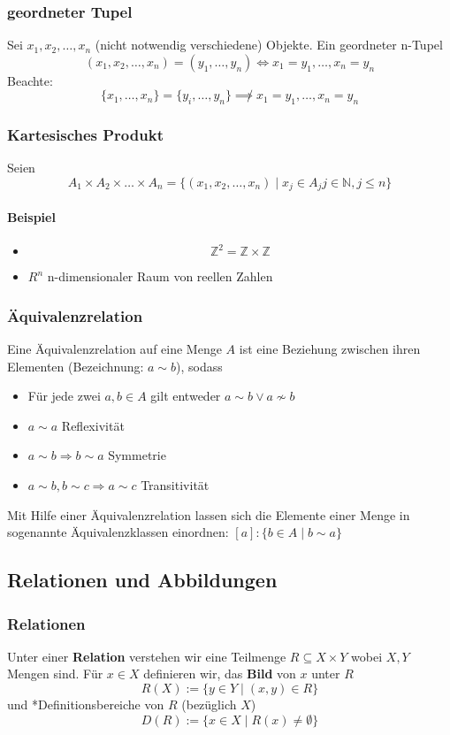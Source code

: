 \documentclass[a4paper]{scrartcl}
\begin{document}
\subsubsection{geordneter Tupel}
\label{sec-2-2-6}
Sei $x_1, x_2, \ldots, x_n$ (nicht notwendig verschiedene) Objekte. Ein geordneter n-Tupel \[(x_1,x_2,\ldots,x_n) = (y_1,\ldots,y_n) \Leftrightarrow x_1 = y_1, \ldots, x_n = y_n\]
Beachte:
\[\{x_1, \ldots, x_n\} = \{y_i,\ldots,y_n\}\not\implies x_1 = y_1, \ldots, x_n = y_n\]
\subsubsection{Kartesisches Produkt}
\label{sec-2-2-7}
Seien \[A_1\times A_2\times \ldots \times A_n = \{(x_1,x_2,\ldots,x_n)\mid x_j \in A_j j\in\mathbb{N}, j \leq n\}\]
\paragraph{Beispiel}
\label{sec-2-2-7-1}
\begin{itemize}
\item \[\mathbb{Z}^2 = \mathbb{Z}\times \mathbb{Z}\]
\item $R^n$ n-dimensionaler Raum von reellen Zahlen
\end{itemize}
\subsubsection{Äquivalenzrelation}
\label{sec-2-2-8}
Eine Äquivalenzrelation auf eine Menge $A$ ist eine Beziehung zwischen ihren Elementen (Bezeichnung: $a \sim b$), sodass
\begin{itemize}
\item Für jede zwei $a,b\in A$ gilt entweder $a\sim b \vee a\not\sim b$
\item $a\sim a$ \hfill Reflexivität
\item $a\sim b \Rightarrow b\sim a$ \hfill Symmetrie
\item $a \sim b, b \sim c \Rightarrow a \sim c$ \hfill Transitivität
\end{itemize}
Mit Hilfe einer Äquivalenzrelation lassen sich die Elemente einer Menge in sogenannte Äquivalenzklassen einordnen: $[a]:\{b\in A\mid b\sim a\}$
\subsection{Relationen und Abbildungen}
\label{sec-2-3}
\subsubsection{Relationen}
\label{sec-2-3-1}
Unter einer \textbf{Relation} verstehen wir eine Teilmenge $R\subseteq X\times Y$ wobei $X, Y$ Mengen sind. Für $x\in X$ definieren wir, das \textbf{Bild} von $x$ unter $R$
\[R(X) := \{y\in Y \mid (x,y) \in R\}\]
und *Definitionsbereiche von $R$ (bezüglich $X$)
\[D(R):= \{x\in X\mid R(x)\neq\emptyset\}\]
\end{document}

